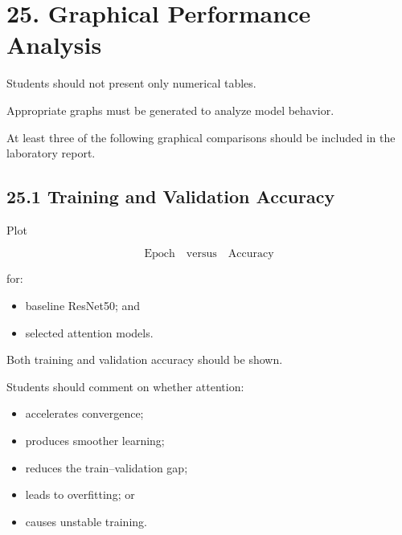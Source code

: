 \documentclass[10pt]{article}
\begin{document}
\section*{25. Graphical Performance Analysis}

Students should not present only numerical tables.

Appropriate graphs must be generated to analyze model behavior.

At least three of the following graphical comparisons should be included in
the laboratory report.

\subsection*{25.1 Training and Validation Accuracy}

Plot

\[
\text{Epoch}
\quad\text{versus}\quad
\text{Accuracy}
\]

for:

\begin{itemize}

\item baseline ResNet50; and

\item selected attention models.

\end{itemize}

Both training and validation accuracy should be shown.

Students should comment on whether attention:

\begin{itemize}

\item accelerates convergence;

\item produces smoother learning;

\item reduces the train--validation gap;

\item leads to overfitting; or

\item causes unstable training.

\end{itemize}
\end{document}

